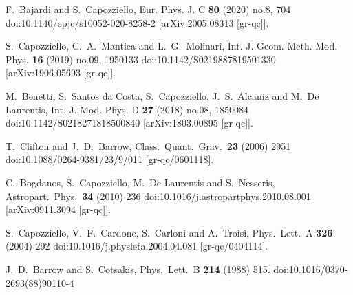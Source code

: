 \documentclass[aps,prd,twocolumn,groupedaddress,showpacs,nofootinbib,amssymb]{revtex4-2}
\begin{document}
\begin{thebibliography}{99}
F.~Bajardi and S.~Capozziello,
Eur. Phys. J. C \textbf{80} (2020) no.8, 704
doi:10.1140/epjc/s10052-020-8258-2 [arXiv:2005.08313 [gr-qc]].


S.~Capozziello, C.~A.~Mantica and L.~G.~Molinari,
Int. J. Geom. Meth. Mod. Phys. \textbf{16} (2019) no.09, 1950133
doi:10.1142/S0219887819501330 [arXiv:1906.05693 [gr-qc]].


M.~Benetti, S.~Santos da Costa, S.~Capozziello, J.~S.~Alcaniz and
M.~De Laurentis,
Int. J. Mod. Phys. D \textbf{27} (2018) no.08, 1850084
doi:10.1142/S0218271818500840 [arXiv:1803.00895 [gr-qc]].

  T.~Clifton and J.~D.~Barrow,
  Class.\ Quant.\ Grav.\  {\bf 23} (2006) 2951
  doi:10.1088/0264-9381/23/9/011
  [gr-qc/0601118].



  C.~Bogdanos, S.~Capozziello, M.~De Laurentis and S.~Nesseris,
  Astropart.\ Phys.\  {\bf 34} (2010) 236
  doi:10.1016/j.astropartphys.2010.08.001
  [arXiv:0911.3094 [gr-qc]].


  S.~Capozziello, V.~F.~Cardone, S.~Carloni and A.~Troisi,
  Phys.\ Lett.\ A {\bf 326} (2004) 292
  doi:10.1016/j.physleta.2004.04.081
  [gr-qc/0404114].


  J.~D.~Barrow and S.~Cotsakis,
  Phys.\ Lett.\ B {\bf 214} (1988) 515.
  doi:10.1016/0370-2693(88)90110-4



\end{thebibliography}
\end{document}

